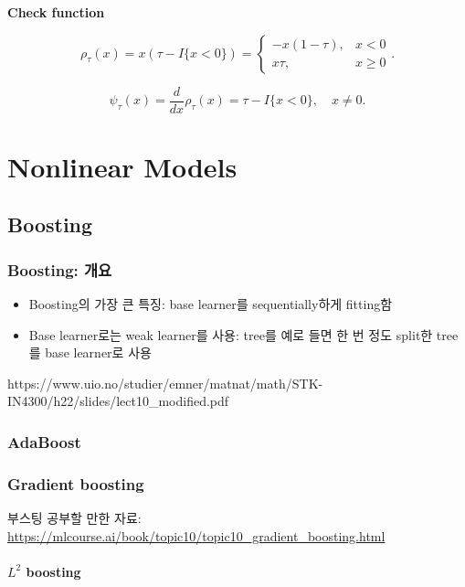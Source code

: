 \documentclass[
  letterpaper,
  DIV=11,
  numbers=noendperiod]{scrreprt}
\theoremstyle{definition}
\theoremstyle{plain}
\theoremstyle{remark}
\begin{document}
\textbf{Check function}

\[
\rho_{\tau} (x)= x(\tau - I\{x<0\})=
\begin{cases}
-x (1-\tau), & x<0\\
x\tau, & x \geq 0
\end{cases}.
\]

\[
\psi_{\tau} (x) = \frac{d}{dx}\rho_{\tau}(x) = \tau - I \{x < 0\}, \quad{} x\neq 0.
\]

\part{Nonlinear Models}

\chapter{Boosting}\label{boosting}

\section{Boosting: 개요}\label{boosting-uxac1cuxc694}

\begin{itemize}
\item
  Boosting의 가장 큰 특징: base learner를 sequentially하게 fitting함
\item
  Base learner로는 weak learner를 사용: tree를 예로 들면 한 번 정도
  split한 tree를 base learner로 사용
\end{itemize}

https://www.uio.no/studier/emner/matnat/math/STK-IN4300/h22/slides/lect10\_modified.pdf

\section{AdaBoost}\label{adaboost}

\section{Gradient boosting}\label{gradient-boosting}

부스팅 공부할 만한 자료:
\url{https://mlcourse.ai/book/topic10/topic10_gradient_boosting.html}

\subsection{\texorpdfstring{\(L^2\)
boosting}{L\^{}2 boosting}}\label{l2-boosting}
\end{document}
